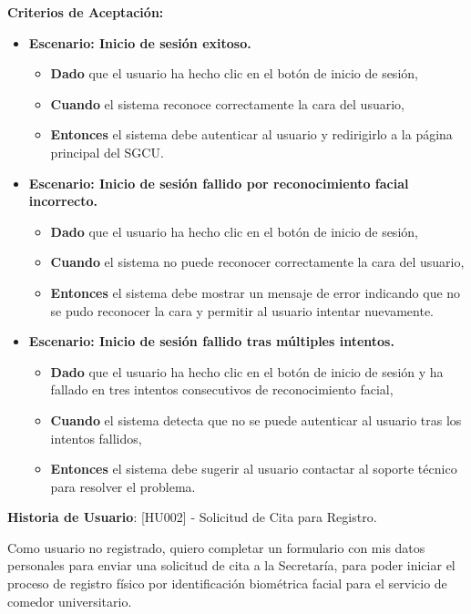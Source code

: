 \documentclass[12pt]{article}
\begin{document}
\textbf{Criterios de Aceptación:}
\begin{itemize}
	\item \textbf{Escenario: Inicio de sesión exitoso.}
	\begin{itemize}
		\item \textbf{Dado} que el usuario ha hecho clic en el botón de inicio de sesión,
		\item \textbf{Cuando} el sistema reconoce correctamente la cara del usuario,
		\item \textbf{Entonces} el sistema debe autenticar al usuario y redirigirlo a la página principal del SGCU.
	\end{itemize}

	\item \textbf{Escenario: Inicio de sesión fallido por reconocimiento facial incorrecto.}
	\begin{itemize}
		\item \textbf{Dado} que el usuario ha hecho clic en el botón de inicio de sesión,
		\item \textbf{Cuando} el sistema no puede reconocer correctamente la cara del usuario,
		\item \textbf{Entonces} el sistema debe mostrar un mensaje de error indicando que no se pudo reconocer la cara y permitir al usuario intentar nuevamente.
	\end{itemize}

	\item \textbf{Escenario: Inicio de sesión fallido tras múltiples intentos.}
	\begin{itemize}
		\item \textbf{Dado} que el usuario ha hecho clic en el botón de inicio de sesión y ha fallado en tres intentos consecutivos de reconocimiento facial,
		\item \textbf{Cuando} el sistema detecta que no se puede autenticar al usuario tras los intentos fallidos,
		\item \textbf{Entonces} el sistema debe sugerir al usuario contactar al soporte técnico para resolver el problema.
	\end{itemize}
\end{itemize}

\pagebreak

\textbf{Historia de Usuario}: [HU002] - Solicitud de Cita para Registro.

Como usuario no registrado, quiero completar un formulario con mis datos personales para enviar una solicitud de cita a la Secretaría, para poder iniciar el proceso de registro físico por identificación biométrica facial para el servicio de comedor universitario.
\end{document}
